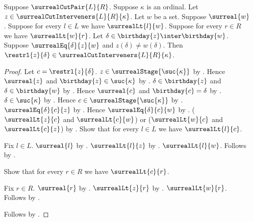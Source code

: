 \begin{lemma}\label{surreal_common_prefix_is_intervener}
    Suppose $\surrealCutPair{L}{R}$.
    Suppose $\kappa$ is an ordinal.
    Let $z\in\surrealCutInterveners{L}{R}{\kappa}$.
    Let $w$ be a set.
    Suppose $\surreal{w}$.
    Suppose for every $l\in L$ we have $\surrealLt{l}{w}$.
    Suppose for every $r\in R$ we have $\surrealLt{w}{r}$.
    Let $\delta\in\birthday{z}\inter\birthday{w}$.
    Suppose $\surrealEq{\delta}{z}{w}$ and
        $z(\delta)\neq w(\delta)$.
    Then $\restrl{z}{\delta}\in
        \surrealCutInterveners{L}{R}{\kappa}$.
\end{lemma}
\begin{proof}
    Let $c=\restrl{z}{\delta}$.
    $z\in\surrealStage{\suc{\kappa}}$
        by .
    Hence $\surreal{z}$ and $\birthday{z}\in\suc{\kappa}$
        by .
    $\delta\in\birthday{z}$ and $\delta\in\birthday{w}$
        by .
    Hence $\surreal{c}$ and $\birthday{c}=\delta$
        by .
    $\delta\in\suc{\kappa}$
        by .
    Hence $c\in\surrealStage{\suc{\kappa}}$
        by .
    $\surrealEq{\delta}{c}{z}$
        by .
    Hence $\surrealEq{\delta}{c}{w}$
        by .
    ($\surrealLt{z}{c}$ and $\surrealLt{c}{w}$) or
        ($\surrealLt{w}{c}$ and $\surrealLt{c}{z}$)
        by .
    Show that for every $l\in L$ we have $\surrealLt{l}{c}$.
    \begin{subproof}
        Fix $l\in L$.
        $\surreal{l}$ by .
        $\surrealLt{l}{z}$ by .
        $\surrealLt{l}{w}$.
        Follows by .
    \end{subproof}
    Show that for every $r\in R$ we have $\surrealLt{c}{r}$.
    \begin{subproof}
        Fix $r\in R$.
        $\surreal{r}$ by .
        $\surrealLt{z}{r}$ by .
        $\surrealLt{w}{r}$.
        Follows by .
    \end{subproof}
    Follows by .
\end{proof}

